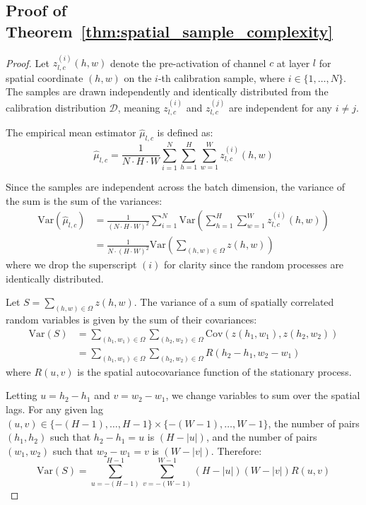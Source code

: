 \documentclass{article}
\theoremstyle{plain}
\theoremstyle{definition}
\theoremstyle{remark}
\begin{document}
\subsection{Proof of Theorem~\ref{thm:spatial_sample_complexity}}
\label{sec:proof_spatial}

\begin{proof}
Let $z^{(i)}_{l,c}(h, w)$ denote the pre-activation of channel $c$ at layer $l$ for spatial coordinate $(h, w)$ on the $i$-th calibration sample, where $i \in \{1, \dots, N\}$. The samples are drawn independently and identically distributed from the calibration distribution $\mathcal{D}$, meaning $z^{(i)}_{l,c}$ and $z^{(j)}_{l,c}$ are independent for any $i \ne j$.

The empirical mean estimator $\hat{\mu}_{l,c}$ is defined as:
\begin{equation}
    \hat{\mu}_{l,c} = \frac{1}{N \cdot H \cdot W} \sum_{i=1}^N \sum_{h=1}^H \sum_{w=1}^W z^{(i)}_{l,c}(h, w)
\end{equation}

Since the samples are independent across the batch dimension, the variance of the sum is the sum of the variances:
\begin{align}
    \mathrm{Var}(\hat{\mu}_{l,c}) &= \frac{1}{(N \cdot H \cdot W)^2} \sum_{i=1}^N \mathrm{Var}\left( \sum_{h=1}^H \sum_{w=1}^W z^{(i)}_{l,c}(h, w) \right) \\
    &= \frac{1}{N \cdot (H \cdot W)^2} \mathrm{Var}\left( \sum_{(h,w) \in \Omega} z(h, w) \right)
\end{align}
where we drop the superscript $(i)$ for clarity since the random processes are identically distributed.

Let $S = \sum_{(h,w) \in \Omega} z(h, w)$. The variance of a sum of spatially correlated random variables is given by the sum of their covariances:
\begin{align}
    \mathrm{Var}(S) &= \sum_{(h_1, w_1) \in \Omega} \sum_{(h_2, w_2) \in \Omega} \mathrm{Cov}(z(h_1, w_1), z(h_2, w_2)) \\
    &= \sum_{(h_1, w_1) \in \Omega} \sum_{(h_2, w_2) \in \Omega} R(h_2 - h_1, w_2 - w_1)
\end{align}
where $R(u, v)$ is the spatial autocovariance function of the stationary process.

Letting $u = h_2 - h_1$ and $v = w_2 - w_1$, we change variables to sum over the spatial lags. For any given lag $(u, v) \in \{-(H-1), \dots, H-1\} \times \{-(W-1), \dots, W-1\}$, the number of pairs $(h_1, h_2)$ such that $h_2 - h_1 = u$ is $(H - |u|)$, and the number of pairs $(w_1, w_2)$ such that $w_2 - w_1 = v$ is $(W - |v|)$. Therefore:
\begin{equation}
    \mathrm{Var}(S) = \sum_{u=-(H-1)}^{H-1} \sum_{v=-(W-1)}^{W-1} (H - |u|)(W - |v|) R(u, v)
\end{equation}


\end{proof}
\end{document}
